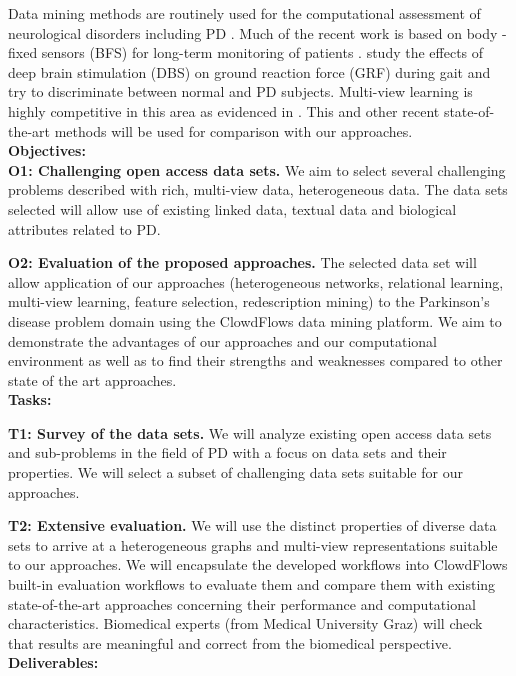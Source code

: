 \documentclass[a4paper,11pt]{article}
\begin{document}
Data mining methods are routinely used for the computational assessment of neurological disorders including PD \citep{Xia2015,eskidere2012}. Much  of  the  recent  work  is  based  on  body -fixed  sensors  (BFS)  for long-term monitoring of patients \citep{patel2008}.
\citet{Muniz:2010:JBiomech} study the effects of deep brain stimulation (DBS) on ground reaction force (GRF) during gait and try to discriminate between normal and PD subjects. Multi-view learning is highly competitive in this area as evidenced in \citep{Santana2015}. This and other recent state-of-the-art methods will be used for comparison with our approaches.
%
\\[0,2cm]
\textbf{Objectives:}\\
\textbf{O1: Challenging open access data sets.} We aim to select several challenging problems described with rich, multi-view data, heterogeneous data. The data sets selected will allow use of existing linked data, textual data and biological attributes related to PD.

\textbf{O2: Evaluation of the proposed approaches.} The selected data set will allow application of our approaches (heterogeneous networks, relational learning, multi-view learning, feature selection, redescription mining) to the Parkinson's disease problem domain using the ClowdFlows data mining platform. We aim to demonstrate the advantages of our approaches and our computational environment as well as to find their strengths and weaknesses compared to other state of the art approaches.
%
%
\\[0,2cm]
\textbf{Tasks:}

\textbf{T1: Survey of the data sets.} We will analyze existing open access data sets and sub-problems in the field of PD with a focus on data sets and their properties. We will select a subset of challenging data sets suitable for our approaches. 

\textbf{T2: Extensive evaluation.} We will use the distinct properties of diverse data sets to arrive at a heterogeneous graphs and multi-view representations suitable to our approaches. We will encapsulate the developed workflows into ClowdFlows built-in evaluation workflows to evaluate them and compare them with existing state-of-the-art approaches concerning their performance and computational characteristics. Biomedical experts (from Medical University Graz) will check that results are meaningful and correct from the biomedical perspective.
%
%
\\[0,2cm]
\textbf{Deliverables:}
\end{document}
